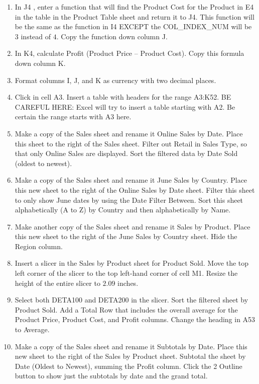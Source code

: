 \begin{enumerate}[resume]
	\item In J4 , enter a  function that will find the Product Cost for the Product in E4 in the table in the Product Table sheet and return it to J4. This  function will be the same as the  function in I4 EXCEPT the COL\_INDEX\_NUM will be $ 3 $ instead of $ 4 $. Copy the function down column J.
	\item In K4, calculate Profit (Product Price – Product Cost). Copy this formula down column K.
	\item Format columns I, J, and K as currency with two decimal places.
	\item Click in cell A3. Insert a table with headers for the range A3:K52. BE CAREFUL HERE: Excel will try to insert a table starting with A2. Be certain the range starts with A3 here.
	\item Make a copy of the Sales sheet and rename it Online Sales by Date. Place this sheet to the right of the Sales sheet. Filter out Retail in Sales Type, so that only Online Sales are displayed. Sort the filtered data by Date Sold (oldest to newest).
	\item Make a copy of the Sales sheet and rename it June Sales by Country. Place this new sheet to the right of the Online Sales by Date sheet. Filter this sheet to only show June dates by using the Date Filter Between. Sort this sheet alphabetically (A to Z) by Country and then alphabetically by Name.
	\item Make another copy of the Sales sheet and rename it Sales by Product. Place this new sheet to the right of the June Sales by Country sheet. Hide the Region column.
	\item Insert a slicer in the Sales by Product sheet for Product Sold. Move the top left corner of the slicer to the top left-hand corner of cell M1. Resize the height of the entire slicer to $ 2.09 $ inches.
	\item Select both DETA100 and DETA200 in the slicer. Sort the filtered sheet by Product Sold. Add a Total Row that includes the overall average for the Product Price, Product Cost, and Profit columns. Change the heading in A53 to Average.
	\item Make a copy of the Sales sheet and rename it Subtotals by Date. Place this new sheet to the right of the Sales by Product sheet. Subtotal the sheet by Date (Oldest to Newest), summing the Profit column. Click the 2 Outline button to show just the subtotals by date and the grand total.

\end{enumerate}
